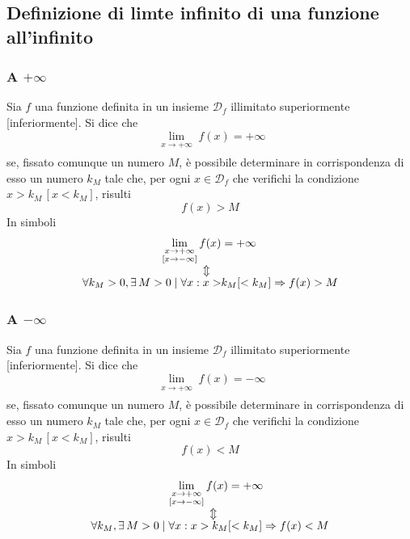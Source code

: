 \subsection{Definizione di limte infinito di una funzione all'infinito}
\subsubsection{A $+\infty$}
\begin{definizioneLimiteInfinitoInfinito1}
  Sia $f$ una funzione definita in un insieme $\mathscr{D}_f$ illimitato superiormente 
  [inferiormente]. Si dice che
  \begin{equation*}
    \lim\limits_{\substack{x\to+\infty\\ [x\to-\infty]}}f(x)=+\infty
  \end{equation*}
  se, fissato comunque un numero $M$, è possibile determinare in corrispondenza di esso un numero 
  $k_M$ tale che, per ogni $x\in\mathscr{D}_f$ che verifichi la condizione $x>k_M\,[x<k_M]$, risulti
  \begin{equation*}
    f(x)>M
  \end{equation*}
  In simboli
  \begin{align*}
    \lim\limits_{\substack{x\to+\infty\\ [x\to-\infty]}}f(x)&=+\infty\\
    \ArrowBetweenLines
    \forall k_M>0, \exists\,M>0\mid\forall x: x>&k_M[<k_M] \Rightarrow f(x) > M
  \end{align*}
\end{definizioneLimiteInfinitoInfinito1}
\subsubsection{A $-\infty$}
\begin{definizioneLimiteInfinitoInfinito2}
  Sia $f$ una funzione definita in un insieme $\mathscr{D}_f$ illimitato superiormente 
  [inferiormente]. Si dice che
  \begin{equation*}
    \lim\limits_{\substack{x\to+\infty\\ [x\to-\infty]}} f(x)=-\infty
  \end{equation*}
  se, fissato comunque un numero $M$, è possibile determinare in corrispondenza di esso un numero 
  $k_M$ tale che, per ogni $x\in\mathscr{D}_f$ che verifichi la condizione $x>k_M\,[x<k_M]$, risulti
  \begin{equation*}
    f(x)<M
  \end{equation*}
  In simboli
  \begin{align*}
    \lim\limits_{\substack{x\to+\infty\\ [x\to-\infty]}}f(x)&=+\infty\\
    \ArrowBetweenLines
    \forall k_M, \exists\,M>0\mid\forall x: x>k_M&[<k_M] \Rightarrow f(x) < M
  \end{align*}
\end{definizioneLimiteInfinitoInfinito2}

